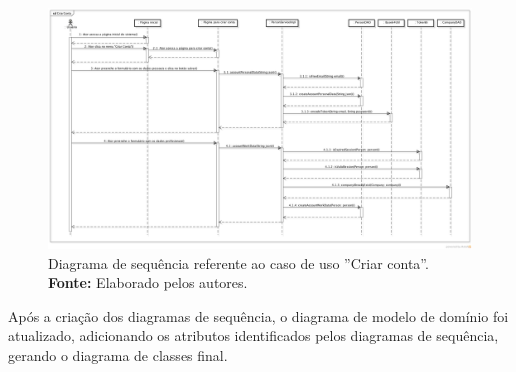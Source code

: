 \captionsetup[figure]{list=no}
\begin{figure}[h!]
	\centerline{\includegraphics[angle=90,scale=0.35]{./imagens/apendices/diagrama-sequencia-criar-conta.png}}
	\caption[Diagrama de sequência referente ao caso de uso ''Criar conta''.]
	{Diagrama de sequência referente ao caso de uso ''Criar conta''. \textbf{Fonte:} Elaborado pelos autores.}
	\label{fig:ap1:diagrama_sequencia_criar_conta}
\end{figure}


Após a criação dos diagramas de sequência, o diagrama de modelo de domínio foi atualizado, adicionando os atributos identificados pelos diagramas de sequência, gerando o diagrama de classes final.
